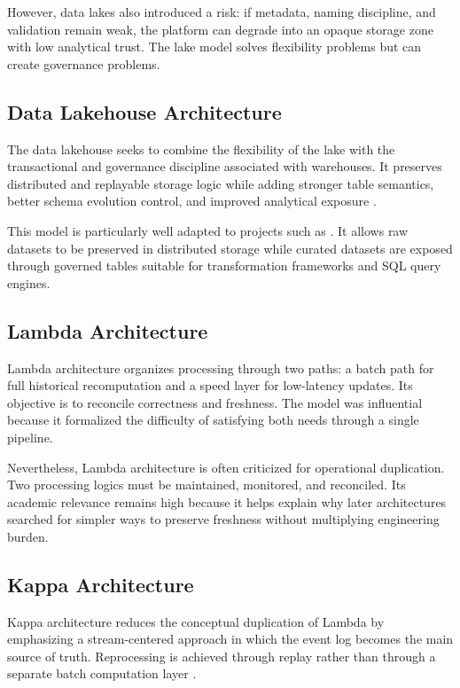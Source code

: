 However, data lakes also introduced a risk: if metadata, naming discipline, and validation remain weak, the platform can degrade into an opaque storage zone with low analytical trust. The lake model solves flexibility problems but can create governance problems.

\subsection{Data Lakehouse Architecture}
The data lakehouse seeks to combine the flexibility of the lake with the transactional and governance discipline associated with warehouses. It preserves distributed and replayable storage logic while adding stronger table semantics, better schema evolution control, and improved analytical exposure \cite{armbrust2021lakehouse}.

This model is particularly well adapted to projects such as \projectname. It allows raw datasets to be preserved in distributed storage while curated datasets are exposed through governed tables suitable for transformation frameworks and SQL query engines.

\subsection{Lambda Architecture}
Lambda architecture organizes processing through two paths: a batch path for full historical recomputation and a speed layer for low-latency updates. Its objective is to reconcile correctness and freshness. The model was influential because it formalized the difficulty of satisfying both needs through a single pipeline.

Nevertheless, Lambda architecture is often criticized for operational duplication. Two processing logics must be maintained, monitored, and reconciled. Its academic relevance remains high because it helps explain why later architectures searched for simpler ways to preserve freshness without multiplying engineering burden.

\subsection{Kappa Architecture}
Kappa architecture reduces the conceptual duplication of Lambda by emphasizing a stream-centered approach in which the event log becomes the main source of truth. Reprocessing is achieved through replay rather than through a separate batch computation layer \cite{kreps2014questioning}.

